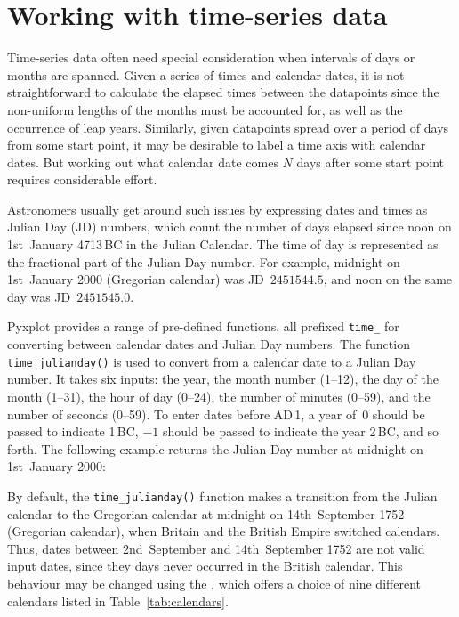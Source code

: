 \section{Working with time-series data}
\label{sec:time_series}

Time-series data often need special consideration when intervals of days or
months are spanned. Given a series of times and calendar dates, it is not
straightforward to calculate the elapsed times between the datapoints since
the non-uniform lengths of the months must be accounted for, as well as the
occurrence of leap years. Similarly, given datapoints spread over a period of
days from some start point, it may be desirable to label a time axis with
calendar dates. But working out what calendar date comes $N$ days after some
start point requires considerable effort.

Astronomers usually get around such issues by expressing dates and times as
Julian Day (JD) numbers, which count the number of
days elapsed since noon on 1st~January 4713\,{\footnotesize BC} in the Julian
Calendar. The time of day is represented as the fractional part of the Julian
Day number. For example, midnight on 1st~January 2000 (Gregorian calendar) was
JD~$2451544.5$, and noon on the same day was JD~$2451545.0$.

Pyxplot provides a range of pre-defined functions, all prefixed {\tt time\_}
for converting between calendar dates and Julian Day numbers. The function {\tt
time\_julianday()} is used to convert from a calendar
date to a Julian Day number. It takes six inputs: the year, the month number
(1--12), the day of the month (1--31), the hour of day (0--24), the number of
minutes (0--59), and the number of seconds (0--59). To enter dates before
{\footnotesize AD}\,1, a year of~$0$ should be passed to indicate
1\,{\footnotesize BC}, $-1$ should be passed to indicate the year
2\,{\footnotesize BC}, and so forth. The following example returns the Julian
Day number at midnight on 1st~January 2000:

\vspace{3mm}

\vspace{3mm}

By default, the {\tt time\_julianday()} function makes a transition from the
Julian calendar to the Gregorian calendar at midnight on 14th~September 1752
(Gregorian calendar), when Britain and the British Empire switched calendars.
Thus, dates between 2nd~September and 14th~September 1752 are not valid input
dates, since they days never occurred in the British calendar. This behaviour
may be changed using the , which offers a choice of nine
different calendars listed in Table~\ref{tab:calendars}.

